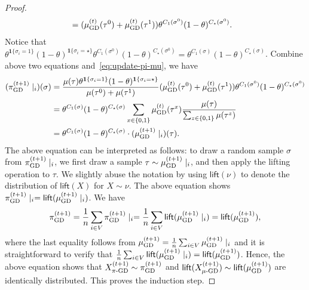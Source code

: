 \documentclass[11pt,a4paper]{article}
\theoremstyle{definition}
\def\*#1{\mathbf{#1}} %
\begin{document}
\begin{proof}
\begin{align*}
    &=(\mu^{(t)}_{\textnormal{GD}}(\tau^0)+\mu^{(t)}_{\textnormal{GD}}(\tau^1))\theta^{C_1(\sigma^0)}(1-\theta)^{C_\star(\sigma^0)}.
    \end{align*}
    Notice that $\theta^{\*1\{\sigma_i=1\}} (1-\theta)^{\*1\{\sigma_i=\star\}}\theta^{C_1(\sigma^0)}(1-\theta)^{C_\star(\sigma^0)}=\theta^{C_1(\sigma)}(1-\theta)^{C_\star(\sigma)}$. Combine above two equations and~\eqref{eq:update-pi-mu}, we have
    \begin{align*}
    (\pi^{(t+1)}_{\textnormal{GD}}\mid_i)(\sigma)&= \frac{\mu(\tau)\theta^{\*1\{\sigma_i=1\}} (1-\theta)^{\*1\{\sigma_i=\star\}}}{\mu(\tau^0)+\mu(\tau^1)} (\mu^{(t)}_{\textnormal{GD}}(\tau^0)+\mu^{(t)}_{\textnormal{GD}}(\tau^1))\theta^{C_1(\sigma^0)}(1-\theta)^{C_\star(\sigma^0)}\\
    &=\theta^{C_1(\sigma)}(1-\theta)^{C_\star(\sigma)}\sum_{x\in \{0,1\}}\mu^{(t)}_{\textnormal{GD}}(\tau^x) \frac{\mu(\tau)}{\sum_{z\in \{0,1\}}\mu(\tau^z)}\\
    &=\theta^{C_1(\sigma)}(1-\theta)^{C_\star(\sigma)} \cdot (\mu^{(t+1)}_{\textnormal{GD}}\mid_i)(\tau).
    \end{align*}
    The above equation can be interpreted as follows: to draw a random sample $\sigma$ from $\pi^{(t+1)}_{\textnormal{GD}}\mid_i$, we first draw a sample $\tau \sim \mu^{(t+1)}_{\textnormal{GD}}\mid_i$, and then apply the lifting operation to $\tau$. We slightly abuse the notation by using $\textsf{lift}(\nu)$ to denote the distribution of $\textsf{lift}(X)$ for $X \sim \nu$. The above equation shows $\pi^{(t+1)}_{\textnormal{GD}}\mid_i = \textsf{lift}(\mu^{(t+1)}_{\textnormal{GD}}\mid_i)$. We have 
    \begin{align*}
    \pi^{(t+1)}_{\textnormal{GD}}=\frac{1}{n}\sum_{i\in V}\pi^{(t+1)}_{\textnormal{GD}}\mid_i = \frac{1}{n} \sum_{i\in V} \textnormal{\textsf{lift}}(\mu^{(t+1)}_{\textnormal{GD}}\mid_i) =\textnormal{\textsf{lift}}(\mu^{(t+1)}_{\textnormal{GD}}),
    \end{align*}
    where the last equality follows from $\mu^{(t+1)}_{\textnormal{GD}} = \frac{1}{n}\sum_{i\in V} \mu^{(t+1)}_{\textnormal{GD}}\mid_i$ and it is straightforward to verify that $\frac{1}{n} \sum_{i\in V} \textnormal{\textsf{lift}}(\mu^{(t+1)}_{\textnormal{GD}}\mid_i) =\textnormal{\textsf{lift}}(\mu^{(t+1)}_{\textnormal{GD}})$. Hence, the above equation shows that $X^{(t+1)}_{\textnormal{$\pi$-GD}} \sim \pi^{(t+1)}_{\textnormal{GD}}$ and $\textnormal{\textsf{lift}}(X^{(t+1)}_{\textnormal{$\mu$-GD}}) \sim \textsf{lift}(\mu^{(t+1)}_{\textnormal{GD}})$ are identically distributed. This proves the induction step.
    

\end{proof}
\end{document}
